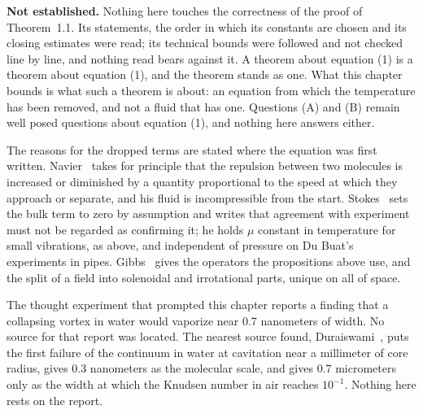 \textbf{Not established.} Nothing here touches the correctness of the proof of Theorem~1.1. Its
statements, the order in which its constants are chosen and its closing estimates were read; its
technical bounds were followed and not checked line by line, and nothing read bears against it. A
theorem about equation (1) is a theorem about equation (1), and
the theorem stands as one. What this chapter bounds is what such a theorem is about: an equation
from which the temperature has been removed, and not a fluid that has one. Questions (A) and (B)
remain well posed questions about equation (1), and nothing here answers either.

The reasons for the dropped terms are stated where the equation was first written.
Navier~\cite{src:Navier-1827} takes for principle that the repulsion between two molecules is
increased or diminished by a quantity proportional to the speed at which they approach or separate,
and his fluid is incompressible from the start. Stokes~\cite{src:Stokes-1845} sets the bulk term
to zero by assumption and writes that agreement with experiment must not be regarded as confirming
it; he holds $\mu$ constant in temperature for small vibrations, as above, and independent of
pressure on Du Buat's experiments in pipes. Gibbs~\cite{src:Gibbs-1884} gives the operators the
propositions above use, and the split of a field into solenoidal and irrotational parts, unique on
all of space.

The thought experiment that prompted this chapter reports a finding that a collapsing vortex in
water would vaporize near 0.7 nanometers of width. No source for that report was located. The
nearest source found, Duraiswami~\cite{src:Duraiswami-2026}, puts the first failure of the
continuum in water at cavitation near a millimeter of core radius, gives 0.3 nanometers as the
molecular scale, and gives 0.7 micrometers only as the width at which the Knudsen number in air
reaches $10^{-1}$. Nothing here rests on the report.
